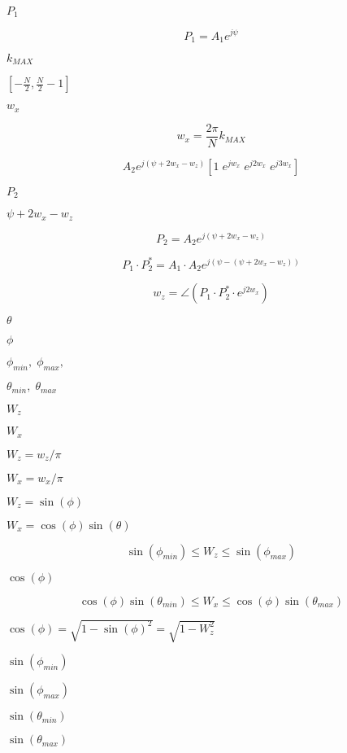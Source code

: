 \documentclass{article}
\begin{document}
$P_1$
\pagebreak

\[ P_1 = A_1 e^{j\psi} \]
\pagebreak

$k_{MAX}$
\pagebreak

$[-\frac{N}{2}, \frac{N}{2}-1]$
\pagebreak

$ w_x $
\pagebreak

\[ w_x = \frac{2\pi}{N}k_{MAX} \]
\pagebreak

\[ A_2 e^{j(\psi + 2 w_x - w_z)} [ 1 \; e^{jw_x} \; e^{j2w_x} \; e^{j3w_x}] \]
\pagebreak

$P_2$
\pagebreak

$\psi + 2w_x - w_z$
\pagebreak

\[ P_2 = A_2 e^{j(\psi+ 2 w_x - w_z)} \]
\pagebreak

\[ P_1 \cdot P_2^* = A_1 \cdot A_2 e^{j(\psi - (\psi+ 2 w_x - w_z))} \]
\pagebreak

\[ w_z=\angle (P_1 \cdot P_2^* \cdot e^{j2w_x}) \]
\pagebreak

$\theta$
\pagebreak

$\phi$
\pagebreak

$\phi_{min},\;\phi_{max},$
\pagebreak

$\theta_{min},\;\theta_{max}$
\pagebreak

$W_z$
\pagebreak

$W_x$
\pagebreak

$W_z = w_z/\pi$
\pagebreak

$W_x = w_x/\pi$
\pagebreak

$W_z = \sin(\phi)$
\pagebreak

$W_x = \cos(\phi) \sin(\theta)$
\pagebreak

\[ \sin(\phi_{min}) \leq W_z \leq \sin(\phi_{max}) \]
\pagebreak

$\cos(\phi)$
\pagebreak

\[ \cos(\phi)\sin(\theta_{min}) \leq W_x \leq \cos(\phi) \sin(\theta_{max}) \]
\pagebreak

$\cos(\phi) = \sqrt{1 - \sin(\phi)^2} = \sqrt{1 - W_z^2}$
\pagebreak

$\sin(\phi_{min})$
\pagebreak

$\sin(\phi_{max})$
\pagebreak

$\sin(\theta_{min})$
\pagebreak

$\sin(\theta_{max})$
\pagebreak
\end{document}
